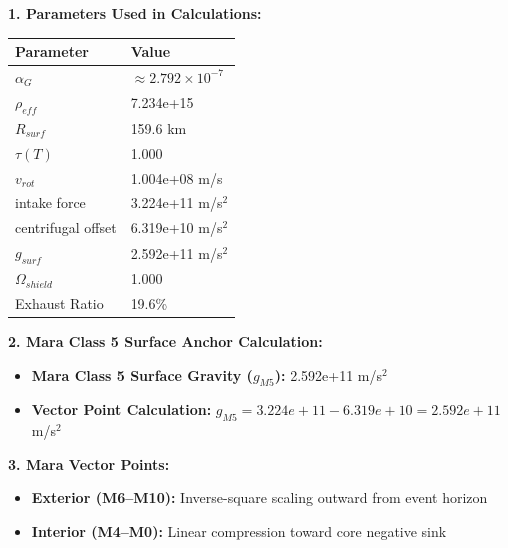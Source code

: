 \documentclass[11pt, a4paper]{article}
\begin{document}
\vspace{0.5em}
\noindent \textbf{1. Parameters Used in Calculations:}
\begin{center}
  \begin{tabular}{|l|l|}
    \hline
    \textbf{Parameter} & \textbf{Value} \\ \hline
    $\alpha_G$ & $\approx 2.792 \times 10^{-7}$ \\ \hline
    $\rho_{eff}$ & 7.234e+15 \\ \hline
    $R_{surf}$ & 159.6 km \\ \hline
    $\tau(T)$ & 1.000 \\ \hline
    $v_{rot}$ & 1.004e+08 m/s \\ \hline
    intake force & 3.224e+11 m/s$^2$ \\ \hline
    centrifugal offset & 6.319e+10 m/s$^2$ \\ \hline
    $g_{surf}$ & 2.592e+11 m/s$^2$ \\ \hline
    $\Omega_{shield}$ & 1.000 \\ \hline
    Exhaust Ratio & 19.6\% \\ \hline
  \end{tabular}
\end{center}

\vspace{0.5em}
\noindent \textbf{2. Mara Class 5 Surface Anchor Calculation:}
\begin{itemize}
  \item \textbf{Mara Class 5 Surface Gravity ($g_{M5}$):} 2.592e+11 m/s$^2$
  \item \textbf{Vector Point Calculation:} $g_{M5} = 3.224e+11 - 6.319e+10 = 2.592e+11$ m/s$^2$
\end{itemize}

\vspace{0.5em}
\noindent \textbf{3. Mara Vector Points:}
\begin{itemize}
  \item \textbf{Exterior (M6--M10):} Inverse-square scaling outward from event horizon
  \item \textbf{Interior (M4--M0):} Linear compression toward core negative sink
\end{itemize}
\end{document}

